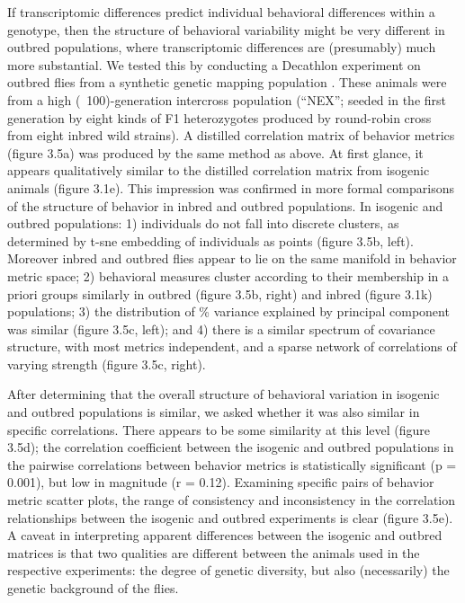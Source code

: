 \documentclass[12pt,letterpaper]{article}
\begin{document}
If transcriptomic differences predict individual behavioral differences within a genotype, then the structure of behavioral variability might be very different in outbred populations, where transcriptomic differences are (presumably) much more substantial. We tested this by conducting a Decathlon experiment on outbred flies from a synthetic genetic mapping population \cite{Long_Dissecting_2014}. These animals were from a high (~100)-generation intercross population (“NEX”; seeded in the first generation by eight kinds of F1 heterozygotes produced by round-robin cross from eight inbred wild strains). A distilled correlation matrix of behavior metrics (figure 3.5a) was produced by the same method as above. At first glance, it appears qualitatively similar to the distilled correlation matrix from isogenic animals (figure 3.1e). This impression was confirmed in more formal comparisons of the structure of behavior in inbred and outbred populations. In isogenic and outbred populations: 1) individuals do not fall into discrete clusters, as determined by t-sne embedding of individuals as points (figure 3.5b, left). Moreover inbred and outbred flies appear to lie on the same manifold in behavior metric space; 2) behavioral measures cluster according to their membership in a priori groups similarly in outbred (figure 3.5b, right) and inbred (figure 3.1k) populations; 3) the distribution of \% variance explained by principal component was similar (figure 3.5c, left); and 4) there is a similar spectrum of covariance structure, with most metrics independent, and a sparse network of correlations of varying strength (figure 3.5c, right). 

After determining that the overall structure of behavioral variation in isogenic and outbred populations is similar, we asked whether it was also similar in specific correlations. There appears to be some similarity at this level (figure 3.5d); the correlation coefficient between the isogenic and outbred populations in the pairwise correlations between behavior metrics is statistically significant (p = 0.001), but low in magnitude (r = 0.12). Examining specific pairs of behavior metric scatter plots, the range of consistency and inconsistency in the correlation relationships between the isogenic and outbred experiments is clear (figure 3.5e). A caveat in interpreting apparent differences between the isogenic and outbred matrices is that two qualities are different between the animals used in the respective experiments: the degree of genetic diversity, but also (necessarily) the genetic background of the flies. 
\end{document}
